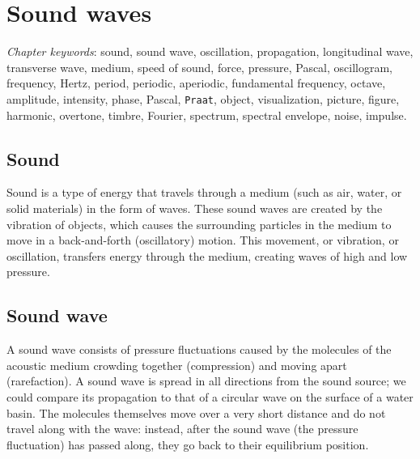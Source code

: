 \documentclass[
]{book}
\begin{document}
\chapter{Sound waves}\label{ch-soundwaves}

\emph{Chapter keywords}: sound, sound wave, oscillation, propagation, longitudinal wave, transverse wave, medium, speed of sound, force, pressure, Pascal, oscillogram, frequency, Hertz, period, periodic, aperiodic, fundamental frequency, octave, amplitude, intensity, phase, Pascal, \texttt{Praat}, object, visualization, picture, figure, harmonic, overtone, timbre, Fourier, spectrum, spectral envelope, noise, impulse.

\section{Sound}\label{sound}

Sound is a type of energy that travels through a medium (such as air, water, or solid materials) in the form of waves. These sound waves are created by the vibration of objects, which causes the surrounding particles in the medium to move in a back-and-forth (oscillatory) motion. This movement, or vibration, or oscillation, transfers energy through the medium, creating waves of high and low pressure.

\section{Sound wave}\label{sec:soundwave}

A sound wave consists of pressure fluctuations caused by the molecules of the acoustic medium crowding together (compression) and moving apart (rarefaction). A sound wave is spread in all directions from the sound source; we could compare its propagation to that of a circular wave on the surface of a water basin. The molecules themselves move over a very short distance and do not travel along with the wave: instead, after the sound wave (the pressure fluctuation) has passed along, they go back to their equilibrium position.
\end{document}
